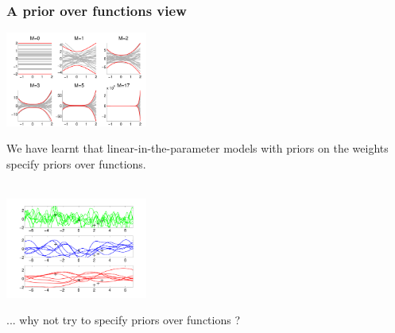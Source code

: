 \begin{frame}
\frametitle{A prior over functions view}

\centerline{\includegraphics[width=0.35\textwidth]{polynomial_prior_envelope}}
%
We have learnt that linear-in-the-parameter models with priors on the weights
 specify priors over functions.\\
\hfill{}\\
\vfill
\centerline{\includegraphics[width=0.35\textwidth]{rejection_sampling_data_priors.pdf}}
%
... why not try to specify priors over functions ?\\
\hfill{}
\end{frame}


